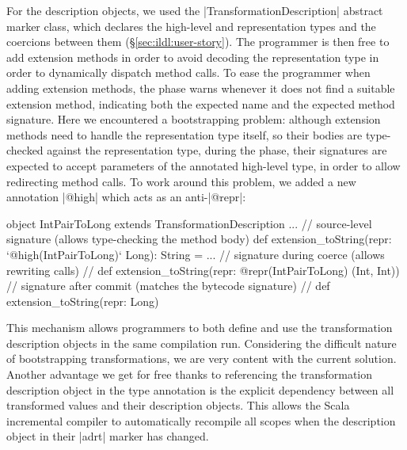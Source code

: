 For the description objects, we used the |TransformationDescription| abstract marker class, which declares the high-level and representation types and the coercions between them (\S\ref{sec:ildl:user-story}). The programmer is then free to add extension methods in order to avoid decoding the representation type in order to dynamically dispatch method calls. To ease the programmer when adding extension methods, the \coerce{} phase warns whenever it does not find a suitable extension method, indicating both the expected name and the expected method signature. Here we encountered a bootstrapping problem: although extension methods need to handle the representation type itself, so their bodies are type-checked against the representation type, during the \coerce{} phase, their signatures are expected to accept parameters of the annotated high-level type, in order to allow redirecting method calls. To work around this problem, we added a new annotation |@high| which acts as an anti-|@repr|:

\begin{lstlisting-nobreak}
object IntPairToLong extends TransformationDescription {
  ...
  // source-level signature (allows type-checking the method body)
  def extension_toString(repr: `@high(IntPairToLong)` Long): String = ...
  // signature during coerce (allows rewriting calls)
  //   def extension_toString(repr: @repr(IntPairToLong) (Int, Int))
  // signature after commit (matches the bytecode signature)
  //   def extension_toString(repr: Long)
}
\end{lstlisting-nobreak}

This mechanism allows programmers to both define and use the transformation description objects in the same compilation run. Considering the difficult nature of bootstrapping transformations, we are very content with the current solution.
Another advantage we get for free thanks to referencing the transformation description object in the type annotation is the explicit dependency between all transformed values and their description objects. This allows the Scala incremental compiler to automatically recompile all scopes when the description object in their |adrt| marker has changed.

